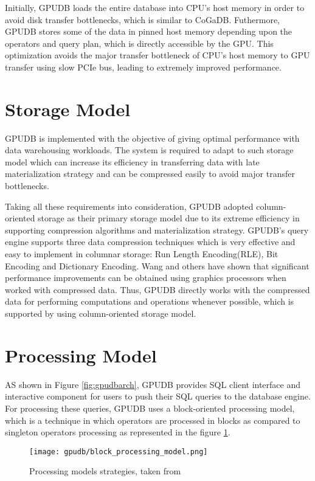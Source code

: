 Initially, GPUDB loads the entire database into CPU's host memory in order to avoid disk transfer bottlenecks, which is similar to CoGaDB. Futhermore, GPUDB stores some of the data in pinned host memory depending upon the operators and query plan, which is directly accessible by the GPU. This optimization avoids the major transfer bottleneck of CPU's host memory to GPU transfer using slow PCIe bus, leading to extremely improved performance.

\section*{Storage Model}
GPUDB is implemented with the objective of giving optimal performance with data warehousing workloads. The system is required to adapt to such storage model which can increase its efficiency in transferring data with late materialization strategy and can be compressed easily to avoid major transfer bottlenecks.

Taking all these requirements into consideration, GPUDB adopted column-oriented storage as their primary storage model due to its extreme efficiency in supporting compression algorithms and materialization strategy. GPUDB's query engine supports three data compression techniques which is very effective and easy to implement in columnar storage: Run Length Encoding(RLE), Bit Encoding and Dictionary Encoding\cite{gpudb_design_impl}. Wang and others have shown that significant performance improvements can be obtained using graphics processors when worked with compressed data\cite{gpudb_fast_computations}. Thus, GPUDB directly works with the compressed data for performing computations and operations whenever possible, which is supported by using column-oriented storage model.

\section*{Processing Model}
AS shown in Figure \ref{fig:gpudbarch}, GPUDB provides SQL client interface and interactive component for users to push their SQL queries to the database engine. For processing these queries, GPUDB uses a block-oriented processing model\cite{gpudb_block_processing}, which is a technique in which operators are processed in blocks as compared to singleton operators processing as represented in the figure \ref{fig:gpudb_processing_models}.

\begin{figure}[ht]
\texttt{[image: gpudb/block\_processing\_model.png]}
\caption{Processing models strategies, taken from \cite{gpudb_block_processing}}
\label{fig:gpudb_processing_models}
\end{figure}

